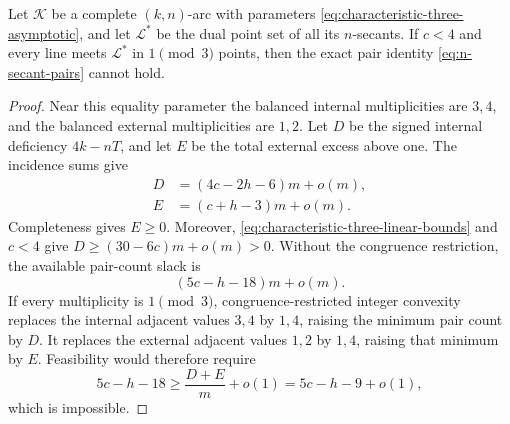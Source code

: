 \begin{lemma}
\label{lem:no-uncorrected-characteristic-three}
Let \(\mathcal K\) be a complete \((k,n)\)-arc with parameters
\eqref{eq:characteristic-three-asymptotic}, and let \(\mathcal L^*\) be the
dual point set of all its \(n\)-secants.  If \(c<4\) and every line meets
\(\mathcal L^*\) in \(1\pmod3\) points, then
the exact pair identity \eqref{eq:n-secant-pairs} cannot hold.
\end{lemma}

\begin{proof}
Near this equality parameter the balanced internal multiplicities are
\(3,4\), and the balanced external multiplicities are \(1,2\).  Let \(D\)
be the signed internal deficiency \(4k-nT\), and let \(E\) be the total
external excess above one.  The incidence sums give
\begin{align}
 D&=(4c-2h-6)m+o(m),\label{eq:D-characteristic-three}\\
 E&=(c+h-3)m+o(m).\label{eq:E-characteristic-three}
\end{align}
Completeness gives \(E\ge0\).  Moreover,
\eqref{eq:characteristic-three-linear-bounds} and \(c<4\) give
\(D\ge(30-6c)m+o(m)>0\).
Without the congruence restriction, the available pair-count slack is
\begin{equation}\label{eq:pair-slack-characteristic-three}
 (5c-h-18)m+o(m).
\end{equation}
If every multiplicity is \(1\pmod3\), congruence-restricted integer
convexity replaces the internal adjacent values \(3,4\) by \(1,4\), raising
the minimum pair count by \(D\).  It replaces the external adjacent values
\(1,2\) by \(1,4\), raising that minimum by \(E\).  Feasibility would therefore
require
\[
 5c-h-18\ge \frac{D+E}{m}+o(1)=5c-h-9+o(1),
\]
which is impossible.
\end{proof}

